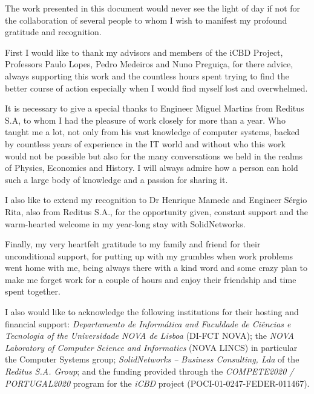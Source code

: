 \acknowledgements

The work presented in this document would never see the light of day if not for the collaboration of several people to whom I wish to manifest my profound gratitude and recognition. 

First I would like to thank my advisors and members of the iCBD Project, Professors Paulo Lopes, Pedro Medeiros and Nuno Preguiça, for there advice, always supporting this work and the countless hours spent trying to find the better course of action especially when I would find myself lost and overwhelmed.

It is necessary to give a special thanks to Engineer Miguel Martins from Reditus S.A, to whom I had the pleasure of work closely for more than a year. Who taught me a lot, not only from his vast knowledge of computer systems, backed by countless years of experience in the IT world and without who this work would not be possible but also for the many conversations we held in the realms of Physics, Economics and History. I will always admire how a person can hold such a large body of knowledge and a passion for sharing it.

I also like to extend my recognition to Dr Henrique Mamede and Engineer Sérgio Rita, also from Reditus S.A., for the opportunity given, constant support and the warm-hearted welcome in my year-long stay with SolidNetworks.

Finally, my very heartfelt gratitude to my family and friend for their unconditional support, for putting up with my grumbles when work problems went home with me, being always there with a kind word and some crazy plan to make me forget work for a couple of hours and enjoy their friendship and time spent together.

I also would like to acknowledge the following institutions for their hosting and financial support: \textit{Departamento de Informática and Faculdade de Ciências e Tecnologia of the Universidade NOVA de Lisboa} (DI-FCT NOVA); the \textit{NOVA Laboratory of Computer Science and Informatics} (NOVA LINCS) in particular the Computer Systems group; \textit{SolidNetworks – Business Consulting, Lda} of the \textit{Reditus S.A. Group}; and the funding provided through the \textit{COMPETE2020 / PORTUGAL2020} program for the \textit{iCBD} project (POCI-01-0247-FEDER-011467).